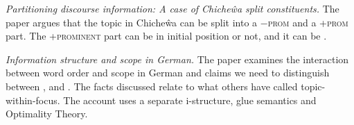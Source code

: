 \documentclass[output=paper,hidelinks]{langscibook}
\begin{document}

\vspace{+6pt}
\citet{MMF05} \textit{Partitioning discourse information: A case of Chiche\^wa split constituents.} The paper argues that the topic in Chiche\^wa can be split into a \textsc{$-$prom} and a \textsc{+prom} part. The \textsc{+prominent} part can be in initial position or not, and it can be \textsc{}.


\vspace{+6pt} 
\citet{CookPayne} \textit{Information structure and scope in German.} The paper examines the interaction between word order and scope in German and claims we need to distinguish between \textsc{}, \textsc{} and \textsc{}. The facts discussed relate to what others have called topic-within-focus. The account uses a separate i-structure, glue semantics and Optimality Theory. 

\end{document}

